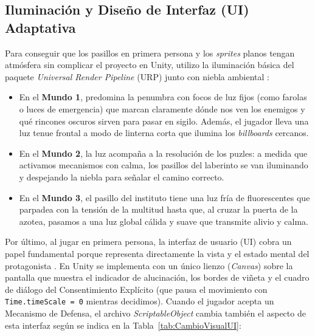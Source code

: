 \subsection{Iluminación y Diseño de Interfaz (UI) Adaptativa}
Para conseguir que los pasillos en primera persona y los \textit{sprites} planos tengan atmósfera sin complicar el proyecto en Unity, utilizo la iluminación básica del paquete \textit{Universal Render Pipeline} (\ac{URP}) junto con niebla ambiental \parencite{unity2023}:

\begin{itemize}
  \item En el \textbf{Mundo 1}, predomina la penumbra con focos de luz fijos (como farolas o luces de emergencia) que marcan claramente dónde nos ven los enemigos y qué rincones oscuros sirven para pasar en sigilo. Además, el jugador lleva una luz tenue frontal a modo de linterna corta que ilumina los \textit{billboards} cercanos.
  \item En el \textbf{Mundo 2}, la luz acompaña a la resolución de los puzles: a medida que activamos mecanismos con calma, los pasillos del laberinto se van iluminando y despejando la niebla para señalar el camino correcto.
  \item En el \textbf{Mundo 3}, el pasillo del instituto tiene una luz fría de fluorescentes que parpadea con la tensión de la multitud hasta que, al cruzar la puerta de la azotea, pasamos a una luz global cálida y suave que transmite alivio y calma.
\end{itemize}

Por último, al jugar en primera persona, la interfaz de usuario (\ac{UI}) cobra un papel fundamental porque representa directamente la vista y el estado mental del protagonista \parencite{gomez2026, hernandez2024}. En Unity se implementa con un único lienzo (\textit{Canvas}) sobre la pantalla que muestra el indicador de alucinación, los bordes de viñeta y el cuadro de diálogo del Consentimiento Explícito (que pausa el movimiento con \texttt{Time.timeScale = 0} mientras decidimos). Cuando el jugador acepta un Mecanismo de Defensa, el archivo \textit{ScriptableObject} cambia también el aspecto de esta interfaz según se indica en la Tabla~\ref{tab:CambioVisualUI}:

